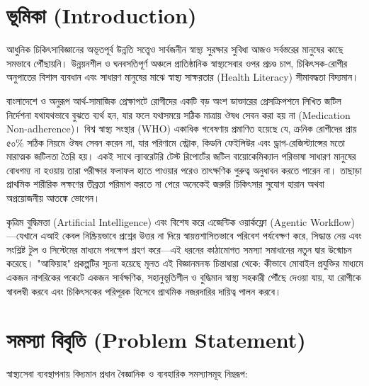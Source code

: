\documentclass[12pt,a4paper,oneside]{report}
\begin{document}
\chapter{ভূমিকা (Introduction)}

আধুনিক চিকিৎসাবিজ্ঞানের অভূতপূর্ব উন্নতি সত্ত্বেও সার্বজনীন স্বাস্থ্য সুরক্ষার সুবিধা আজও সর্বস্তরের মানুষের কাছে সমভাবে পৌঁছায়নি। উন্নয়নশীল ও ঘনবসতিপূর্ণ অঞ্চলে প্রাতিষ্ঠানিক স্বাস্থ্যসেবার ওপর প্রচণ্ড চাপ, চিকিৎসক-রোগীর অনুপাতের বিশাল ব্যবধান এবং সাধারণ মানুষের মাঝে স্বাস্থ্য সাক্ষরতার (Health Literacy) সীমাবদ্ধতা বিদ্যমান।

বাংলাদেশে ও অনুরূপ আর্থ-সামাজিক প্রেক্ষাপটে রোগীদের একটি বড় অংশ ডাক্তারের প্রেসক্রিপশনে লিখিত জটিল নির্দেশনা যথাযথভাবে বুঝতে ব্যর্থ হন, যার ফলে যথাসময়ে সঠিক মাত্রায় ঔষধ সেবন করা হয় না (Medication Non-adherence)। বিশ্ব স্বাস্থ্য সংস্থার (WHO) একাধিক গবেষণায় প্রমাণিত হয়েছে যে, ক্রনিক রোগীদের প্রায় ৫০\% সঠিক নিয়মে ঔষধ সেবন করেন না, যার পরিণামে স্ট্রোক, কিডনি ফেইলিউর এবং ড্রাগ-রেজিস্ট্যান্সের মতো মারাত্মক জটিলতা তৈরি হয়। একই সাথে ল্যাবরেটরি টেস্ট রিপোর্টের জটিল বায়োকেমিক্যাল পরিভাষা সাধারণ মানুষের বোধগম্য না হওয়ায় তারা পরীক্ষার ফলাফল হাতে পাওয়ার পরেও তাৎক্ষণিক গুরুত্ব অনুধাবন করতে পারেন না। তাছাড়া প্রাথমিক শারীরিক লক্ষণের তীব্রতা পরিমাপ করতে না পেরে অনেকেই জরুরি চিকিৎসার সুযোগ হারান অথবা অপ্রয়োজনীয় আতঙ্কে ভোগেন।

কৃত্রিম বুদ্ধিমত্তা (Artificial Intelligence) এবং বিশেষ করে এজেন্টিক ওয়ার্কফ্লো (Agentic Workflow)—যেখানে এআই কেবল নিষ্ক্রিয়ভাবে প্রশ্নের উত্তর না দিয়ে স্বায়ত্তশাসিতভাবে পরিবেশ পর্যবেক্ষণ করে, সিদ্ধান্ত নেয় এবং সংশ্লিষ্ট টুল ও সিস্টেমের মাধ্যমে পদক্ষেপ গ্রহণ করে—এই ধরনের কাঠামোগত সমস্যা সমাধানের নতুন দ্বার উন্মোচন করেছে। "আফিয়াহ" প্রকল্পটির সূচনা হয়েছে মূলত এই বিজ্ঞানমনস্ক চিন্তাধারা থেকে: কীভাবে মোবাইল প্রযুক্তির মাধ্যমে একজন নাগরিকের পকেটে একজন সার্বক্ষণিক, সহানুভূতিশীল ও বুদ্ধিমান স্বাস্থ্য সহকারী পৌঁছে দেওয়া যায়, যা রোগীকে স্বাবলম্বী করবে এবং চিকিৎসকের পরিপূরক হিসেবে প্রাথমিক নজরদারির দায়িত্ব পালন করবে।

\chapter{সমস্যা বিবৃতি (Problem Statement)}

স্বাস্থ্যসেবা ব্যবস্থাপনায় বিদ্যমান প্রধান বৈজ্ঞানিক ও ব্যবহারিক সমস্যাসমূহ নিম্নরূপ:
\end{document}

